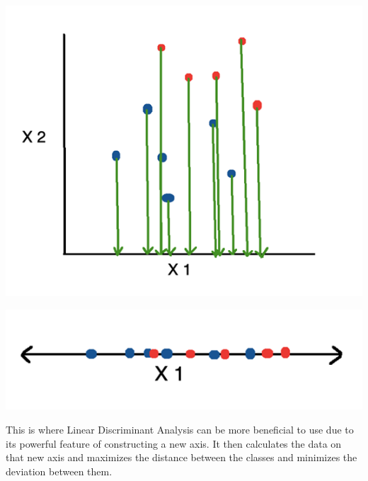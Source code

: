 \documentclass[a4paper,12pt]{report}
\begin{document}
\begin{center}
    \captionsetup{type=figure}
    \includegraphics[width=.5\linewidth]{media/LDAgraph2.png}
\end{center}

\begin{center}
    \captionsetup{type=figure}
    \includegraphics[width=.5\linewidth]{media/LDAgraph3.png}
\end{center}

This is where Linear Discriminant Analysis can be more beneficial to use due to its powerful feature of constructing a new axis. It then calculates the data on that new axis and maximizes the distance between the classes and minimizes the deviation between them. 
\end{document}
